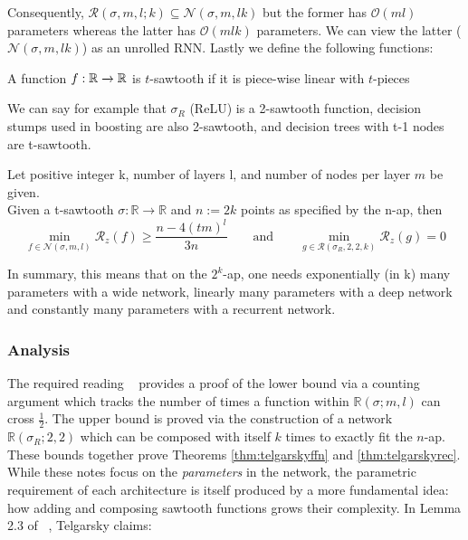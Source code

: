\documentclass{article}
\begin{document}
Consequently, $\mathscr{R}(\sigma, m, l; k) \subseteq \mathscr{N}(\sigma, m, lk)$ but the former has $\mathcal{O}(ml)$ parameters whereas the latter has $\mathcal{O}(mlk)$ parameters. We can view the latter ($\mathscr{N}(\sigma, m, lk)$) as an unrolled RNN. Lastly we define the following functions:

\begin{defn}[Sawtooth]
A function $f: \mathbb{R} \xrightarrow{} \mathbb{R}$ is $t$-sawtooth if it is piece-wise linear with $t$-pieces
\end{defn}
We can say for example that $\sigma_R$ (ReLU) is a 2-sawtooth function, decision stumps used in boosting are also 2-sawtooth, and decision trees with t-1 nodes are t-sawtooth.

\begin{thm}
\label{thm:telgarskyrec}
Let positive integer k, number of layers l, and number of nodes per layer $m$ be given. \\
Given a t-sawtooth $\sigma : \mathbb{R} \to \mathbb{R}$ and $n := 2k$ points as specified by the n-ap, then \\
$$\min_{f\in\mathscr{N}(\sigma, m, l)} \mathcal{R}_z(f) \geq \frac{n-4(tm)^l}{3n} \quad \quad \text{and} \quad \quad \min_{g\in\mathscr{R}(\sigma_R, 2, 2, k)} \mathcal{R}_z(g) = 0$$
\end{thm}
In summary, this means that on the $2^k$-ap, one needs exponentially (in k) many parameters with a wide network, linearly many parameters with a deep network and constantly many parameters with a recurrent network.

\subsubsection{Analysis}
The required reading ~\citep{telgarsky2015representation} provides a proof of the lower bound via a counting argument which tracks the number of times a function within $\mathbb{R}(\sigma;m,l)$ can cross $\frac{1}{2}$. The upper bound is proved via the construction of a network $\mathbb{R}(\sigma_R; 2, 2)$ which can be composed with itself $k$ times to exactly fit the $n$-ap. These bounds together prove Theorems \ref{thm:telgarskyffn} and \ref{thm:telgarskyrec}.\\

While these notes focus on the \textit{parameters} in the network, the parametric requirement of each architecture is itself produced by a more fundamental idea: how adding and composing sawtooth functions grows their complexity. In Lemma 2.3 of ~\citep{telgarsky2015representation}, Telgarsky claims:
\end{document}
